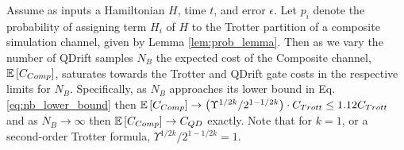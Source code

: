\begin{theorem}
    Assume as inputs a Hamiltonian $H$, time $t$, and error $\epsilon$. Let $p_i$ denote the probability of assigning term $H_i$ of $H$ to the Trotter partition of a composite simulation channel, given by Lemma \ref{lem:prob_lemma}. Then as we vary the number of QDrift samples $N_B$ the expected cost of the Composite channel, $\mathbb{E}\left[ C_{Comp} \right]$, saturates towards the Trotter and QDrift gate costs in the respective limits for $N_B$. Specifically, as $N_B$ approaches its lower bound in Eq. \eqref{eq:nb_lower_bound} then $\mathbb{E}\left[ C_{Comp} \right] \to \left( \Upsilon^{1/2k} / 2^{1 - 1/2k} \right) \cdot C_{Trott} \leq 1.12 C_{Trott}$ and as $N_B \to \infty$ then $\mathbb{E}\left[ C_{Comp} \right] \to C_{QD}$ exactly. Note that for $k=1$, or a second-order Trotter formula, $\Upsilon^{1/2k} / 2^{1-1/2k} = 1$.
\end{theorem}
